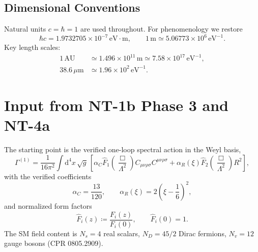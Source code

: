 \documentclass[11pt,a4paper]{article}
\newcommand{\dd}{\mathrm{d}}
\newcommand{\Weylsq}{C_{\mu\nu\rho\sigma}C^{\mu\nu\rho\sigma}}
\newcommand{\Rsq}{R^2}
\newcommand{\Fhat}{\hat{F}}
\begin{document}
\subsection{Dimensional Conventions}

Natural units $c=\hbar=1$ are used throughout.  For phenomenology we
restore
\begin{equation}
  \hbar c = 1.9732705 \times 10^{-7}\,\mathrm{eV\cdot m},
  \qquad
  1\,\mathrm{m} \simeq 5.06773 \times 10^{6}\,\mathrm{eV}^{-1}.
\end{equation}
Key length scales:
\begin{align}
  1\,\mathrm{AU}
    &\simeq 1.496 \times 10^{11}\,\mathrm{m}
    \simeq 7.58 \times 10^{17}\,\mathrm{eV}^{-1}, \\
  38.6\,\mu\mathrm{m}
    &\simeq 1.96 \times 10^{2}\,\mathrm{eV}^{-1}.
\end{align}


\section{Input from NT-1b Phase 3 and NT-4a}
\label{sec:input}

The starting point is the verified one-loop spectral action in the Weyl
basis,
\begin{equation}\label{eq:spectral-action}
  \Gamma^{(1)}
  = \frac{1}{16\pi^2}\int \dd^4x \,\sqrt{g}\,
  \left[
    \alpha_C \Fhat_1\!\left(\frac{\Box}{\Lambda^2}\right)\Weylsq
    + \alpha_R(\xi)\Fhat_2\!\left(\frac{\Box}{\Lambda^2}\right)\Rsq
  \right],
\end{equation}
with the verified coefficients
\begin{equation}\label{eq:alphas}
  \alpha_C = \frac{13}{120},
  \qquad
  \alpha_R(\xi) = 2\left(\xi - \frac{1}{6}\right)^2,
\end{equation}
and normalized form factors
\begin{equation}\label{eq:fhat}
  \Fhat_i(z) \coloneqq \frac{F_i(z)}{F_i(0)},
  \qquad
  \Fhat_i(0)=1.
\end{equation}
The SM field content is $N_s = 4$ real scalars, $N_D = 45/2$ Dirac
fermions, $N_v = 12$ gauge bosons (CPR 0805.2909).
\end{document}
